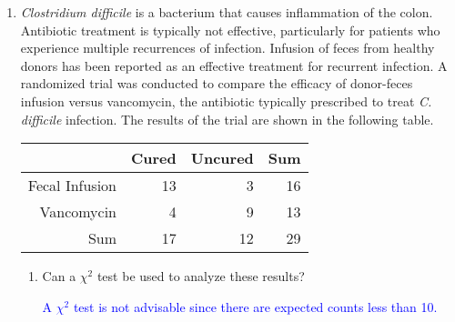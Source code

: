 \documentclass[letterpaper,12pt,twoside,]{pinp}
\begin{document}
\begin{enumerate}
\def\labelenumi{\arabic{enumi}.}
\setcounter{enumi}{4}
\item
  \textit{Clostridium difficile} is a bacterium that causes inflammation
  of the colon. Antibiotic treatment is typically not effective,
  particularly for patients who experience multiple recurrences of
  infection. Infusion of feces from healthy donors has been reported as
  an effective treatment for recurrent infection. A randomized trial was
  conducted to compare the efficacy of donor-feces infusion versus
  vancomycin, the antibiotic typically prescribed to treat
  \textit{C. difficile }infection. The results of the trial are shown in
  the following table.

  \begin{table}[h]
   \centering
   \begin{tabular}{rrr|r}
       \hline
       & Cured & Uncured & Sum \\ 
       \hline
       Fecal Infusion & 13 & 3 & 16 \\ 
       Vancomycin & 4 & 9 & 13 \\ 
       \hline
       Sum & 17 & 12 & 29 \\ 
       \hline
   \end{tabular}
   \end{table}

  \begin{enumerate}
  \def\labelenumii{\alph{enumii})}
  \item
    Can a \(\chi^2\) test be used to analyze these results?

    \textcolor{blue}{A $\chi^2$ test is not advisable since there are expected counts less than 10.}
  \end{enumerate}

\begin{Shaded}
\begin{Highlighting}[]
\StringTok{ }\NormalTok{(}\NormalTok{(}\NormalTok{, }\NormalTok{, }\NormalTok{, }\NormalTok{), } \NormalTok{, } \NormalTok{, }
\StringTok{ }\NormalTok{(}\NormalTok{ =}\StringTok{ }\NormalTok{(}\NormalTok{, }\NormalTok{),}
                            \NormalTok{ =}\StringTok{ }\NormalTok{(}\NormalTok{, }
                                            \NormalTok{))}


\end{Highlighting}
\end{Shaded}
\end{enumerate}
\end{document}
